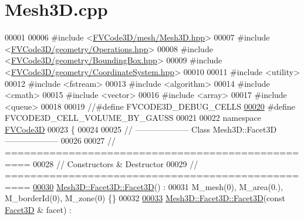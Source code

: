 \hypertarget{Mesh3D_8cpp_source}{}\section{Mesh3\+D.\+cpp}
\label{Mesh3D_8cpp_source}

\begin{DoxyCode}
00001 
00006 \textcolor{preprocessor}{#include <\hyperlink{Mesh3D_8hpp}{FVCode3D/mesh/Mesh3D.hpp}>}
00007 \textcolor{preprocessor}{#include <\hyperlink{Operations_8hpp}{FVCode3D/geometry/Operations.hpp}>}
00008 \textcolor{preprocessor}{#include <\hyperlink{BoundingBox_8hpp}{FVCode3D/geometry/BoundingBox.hpp}>}
00009 \textcolor{preprocessor}{#include <\hyperlink{CoordinateSystem_8hpp}{FVCode3D/geometry/CoordinateSystem.hpp}>}
00010 
00011 \textcolor{preprocessor}{#include <utility>}
00012 \textcolor{preprocessor}{#include <fstream>}
00013 \textcolor{preprocessor}{#include <algorithm>}
00014 \textcolor{preprocessor}{#include <cmath>}
00015 \textcolor{preprocessor}{#include <vector>}
00016 \textcolor{preprocessor}{#include <array>}
00017 \textcolor{preprocessor}{#include <queue>}
00018 
00019 \textcolor{comment}{//#define FVCODE3D\_DEBUG\_CELLS}
\hypertarget{Mesh3D_8cpp_source.tex_l00020}{}\hyperlink{Mesh3D_8cpp_a552a4f8df42d50060ac684d3eda1bb0c}{00020} \textcolor{preprocessor}{#define FVCODE3D\_CELL\_VOLUME\_BY\_GAUSS}
00021 
00022 \textcolor{keyword}{namespace }\hyperlink{namespaceFVCode3D}{FVCode3D}
00023 \{
00024 
00025 \textcolor{comment}{// --------------------   Class Mesh3D::Facet3D   --------------------}
00026 
00027 \textcolor{comment}{// ==================================================}
00028 \textcolor{comment}{// Constructors & Destructor}
00029 \textcolor{comment}{// ==================================================}
\hypertarget{Mesh3D_8cpp_source.tex_l00030}{}\hyperlink{classFVCode3D_1_1Mesh3D_1_1Facet3D_a6a7aee209946492b9b0d31e04e33a290}{00030} \hyperlink{classFVCode3D_1_1Mesh3D_1_1Facet3D_a6a7aee209946492b9b0d31e04e33a290}{Mesh3D::Facet3D::Facet3D}() :
00031         M\_mesh(0), M\_area(0.), M\_borderId(0), M\_zone(0) \{\}
00032 
\hypertarget{Mesh3D_8cpp_source.tex_l00033}{}\hyperlink{classFVCode3D_1_1Mesh3D_1_1Facet3D_a0eff032c65d0fad89835a77c683b60ce}{00033} \hyperlink{classFVCode3D_1_1Mesh3D_1_1Facet3D_a6a7aee209946492b9b0d31e04e33a290}{Mesh3D::Facet3D::Facet3D}(\textcolor{keyword}{const} \hyperlink{classFVCode3D_1_1Mesh3D_1_1Facet3D}{Facet3D} & facet) :

\end{DoxyCode}
